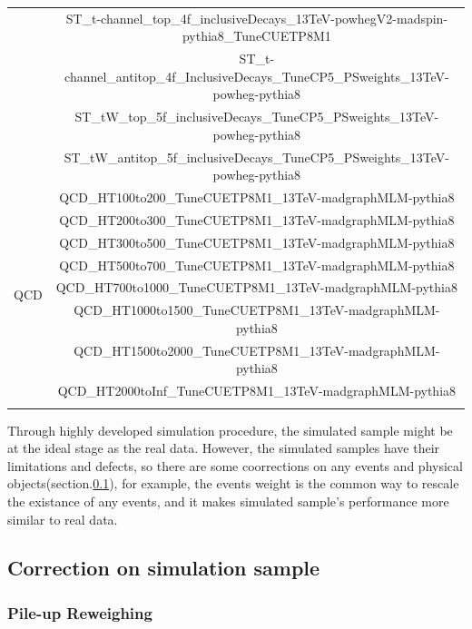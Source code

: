 \begin{center}
\begin{longtable}{ c c }
$$		 & ST\_t-channel\_top\_4f\_inclusiveDecays\_13TeV-powhegV2-madspin-pythia8\_TuneCUETP8M1 \\
		 & ST\_t-channel\_antitop\_4f\_InclusiveDecays\_TuneCP5\_PSweights\_13TeV-powheg-pythia8 \\
		 & ST\_tW\_top\_5f\_inclusiveDecays\_TuneCP5\_PSweights\_13TeV-powheg-pythia8 \\
		 & ST\_tW\_antitop\_5f\_inclusiveDecays\_TuneCP5\_PSweights\_13TeV-powheg-pythia8 \\
		\hline
		\multirow{8}{2em}{QCD} & QCD\_HT100to200\_TuneCUETP8M1\_13TeV-madgraphMLM-pythia8 \\
		 & QCD\_HT200to300\_TuneCUETP8M1\_13TeV-madgraphMLM-pythia8 \\
		 & QCD\_HT300to500\_TuneCUETP8M1\_13TeV-madgraphMLM-pythia8 \\
		 & QCD\_HT500to700\_TuneCUETP8M1\_13TeV-madgraphMLM-pythia8 \\
		 & QCD\_HT700to1000\_TuneCUETP8M1\_13TeV-madgraphMLM-pythia8 \\
		 & QCD\_HT1000to1500\_TuneCUETP8M1\_13TeV-madgraphMLM-pythia8 \\
		 & QCD\_HT1500to2000\_TuneCUETP8M1\_13TeV-madgraphMLM-pythia8 \\
		 & QCD\_HT2000toInf\_TuneCUETP8M1\_13TeV-madgraphMLM-pythia8 \\
		\hline
		\label{DataMC:tb:filename}
		\end{longtable}
		\end{center}



		Through highly developed simulation procedure, the simulated sample might be at the ideal stage as the real data. However, the simulated samples have their limitations and defects, so there are some coorrections on any events and physical objects(section.\ref{ssec:DataAndMC_corMC}), for example, the events weight is the common way to rescale the existance of any events, and it makes simulated sample's performance more similar to real data.

	\subsection{Correction on simulation sample}
	\label{ssec:DataAndMC_corMC}

		\subsubsection{Pile-up Reweighing}
		\label{sssec:DataAndMC_PU}

